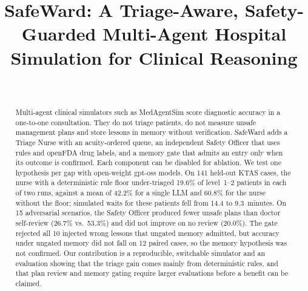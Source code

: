 \documentclass[conference]{IEEEtran}
\begin{document}
\title{SafeWard: A Triage-Aware, Safety-Guarded Multi-Agent Hospital Simulation for Clinical Reasoning}

\author{
\and
{}
\and
{}
\\
}

\maketitle

\begin{abstract}
Multi-agent clinical simulators such as MedAgentSim score diagnostic accuracy in a one-to-one
consultation. They do not triage patients, do not measure unsafe management plans and store lessons
in memory without verification. SafeWard adds a Triage Nurse with an acuity-ordered queue, an
independent Safety Officer that uses rules and openFDA drug labels, and a memory gate that admits an
entry only when its outcome is confirmed. Each component can be disabled for ablation. We test one
hypothesis per gap with open-weight gpt-oss models. On 141 held-out KTAS cases, the nurse with a
deterministic rule floor under-triaged 19.6\% of level~1--2 patients in each of two runs, against a
mean of 42.2\% for a single LLM and 60.8\% for the nurse without the floor; simulated waits for these patients fell from 14.4 to
9.3~minutes. On 15 adversarial scenarios, the Safety Officer produced fewer unsafe plans than doctor
self-review (26.7\% vs.\ 53.3\%) and did not improve on no review (20.0\%). The gate rejected all 10
injected wrong lessons that ungated memory admitted, but accuracy under ungated memory did not fall
on 12 paired cases, so the memory hypothesis was not confirmed. Our contribution is a reproducible,
switchable simulator and an evaluation showing that the triage gain comes mainly from deterministic
rules, and that plan review and memory gating require larger evaluations before a benefit can be
claimed.
\end{abstract}
\end{document}
